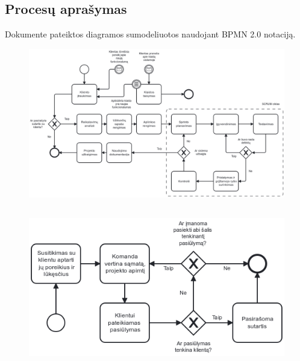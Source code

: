 



\begin{landscape}
\section{Procesų aprašymas}
Dokumente pateiktos diagramos sumodeliuotos naudojant BPMN 2.0 notaciją.
\thispagestyle{empty}
\begin{figure}[H]%
    \centering
    \includegraphics[width=0.85\linewidth]{./etc/diagrams/processes.png}
\end{figure}
\end{landscape}

\subsection{} %

\begin{figure}[H]%
    \centering
    \includegraphics[width=0.75\linewidth]{./etc/diagrams/engage-client.png}
\end{figure}

